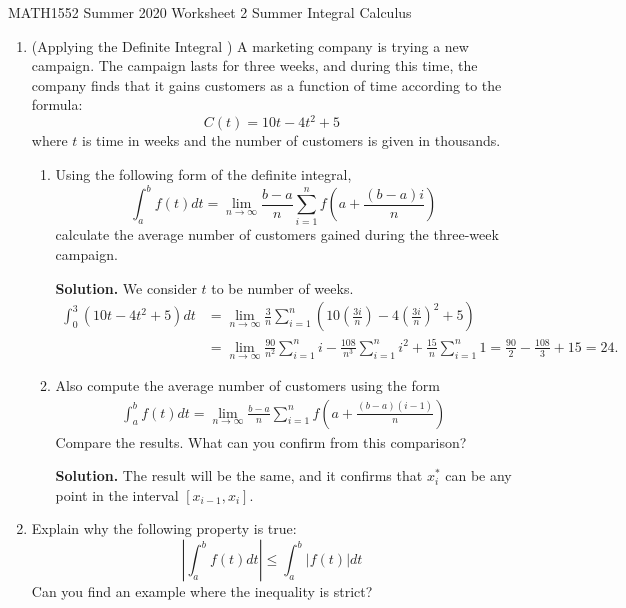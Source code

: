 \documentclass[12pt]{article}
\begin{document}
\noindent
MATH1552 Summer 2020
\hspace{2.2cm}
Worksheet 2 Summer
\hspace{2cm} Integral Calculus

\vspace{2mm}


\begin{enumerate}
 \item   (Applying the Definite Integral ) A marketing company is trying a new campaign. The
campaign lasts for three weeks, and during this time, the company finds that it gains
customers as a function of time according to the formula:
$$C(t)=10t-4t^2+5$$
where $t$ is time in weeks and the number of customers is given in thousands.
\begin{enumerate}
\item Using the following form of the definite integral,
$$\int_{a}^{b}f(t)dt=\lim_{n\rightarrow \infty}\frac{b-a}{n}\sum_{i=1}^n f(a+\frac{(b-a)i}{n})$$
calculate the average number of customers gained during the three-week campaign.

\textbf{Solution.} We consider $t$ to be number of weeks.
\begin{align*}
\int_{0}^{3}(10t-4t^2+5)dt&=\lim_{n\rightarrow \infty}\frac{3}{n}\sum_{i=1}^n \left(10\left(\frac{3i}{n}\right)-4\left(\frac{3i}{n}\right)^2+5\right)\nonumber\\
&=\lim_{n\rightarrow \infty}\frac{90}{n^2}\sum_{i=1}^n i - \frac{108}{n^3}\sum_{i=1}^n i^2 +\frac{15}{n}\sum_{i=1}^n 1=\frac{90}{2}-\frac{108}{3}+15=24. 
\end{align*}

\item Also compute the average number of customers using the form
\begin{align*}
\int_{a}^{b}f(t)dt=\lim_{n\rightarrow \infty}\frac{b-a}{n}\sum_{i=1}^n f(a+\frac{(b-a)(i-1)}{n})
\end{align*}
Compare the results. What can you confirm from this comparison?

\textbf{Solution. }The result will be the same, and it confirms that $x_i^*$ can be any point in the interval $[x_{i-1},x_i]$.
\end{enumerate}

\item Explain why the following property is true:
$$\left\vert\int_{a}^{b}f(t)dt\right\vert\leq \int_{a}^b |f(t)|dt$$
Can you find an example where the inequality is strict?



\end{enumerate}
\end{document}
